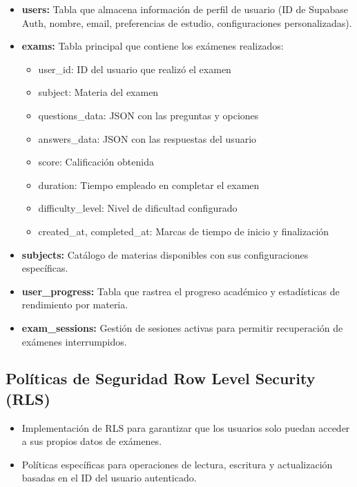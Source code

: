 \documentclass[12pt,a4paper]{report}
\begin{document}
\begin{itemize}
\item \textbf{users:} Tabla que almacena información de perfil de usuario (ID de Supabase Auth, nombre, email, preferencias de estudio, configuraciones personalizadas).

\item \textbf{exams:} Tabla principal que contiene los exámenes realizados:
\begin{itemize}
\item user\_id: ID del usuario que realizó el examen
\item subject: Materia del examen
\item questions\_data: JSON con las preguntas y opciones
\item answers\_data: JSON con las respuestas del usuario
\item score: Calificación obtenida
\item duration: Tiempo empleado en completar el examen
\item difficulty\_level: Nivel de dificultad configurado
\item created\_at, completed\_at: Marcas de tiempo de inicio y finalización
\end{itemize}

\item \textbf{subjects:} Catálogo de materias disponibles con sus configuraciones específicas.

\item \textbf{user\_progress:} Tabla que rastrea el progreso académico y estadísticas de rendimiento por materia.

\item \textbf{exam\_sessions:} Gestión de sesiones activas para permitir recuperación de exámenes interrumpidos.
\end{itemize}

\subsection{Políticas de Seguridad Row Level Security (RLS)}

\begin{itemize}
\item Implementación de RLS para garantizar que los usuarios solo puedan acceder a sus propios datos de exámenes.
\item Políticas específicas para operaciones de lectura, escritura y actualización basadas en el ID del usuario autenticado.
\end{itemize}
\end{document}
